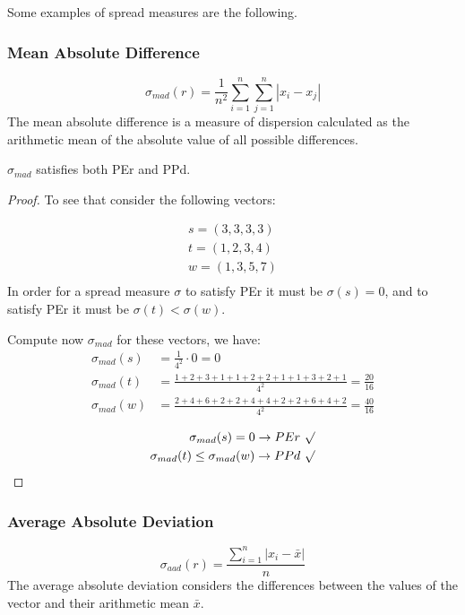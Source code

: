 \documentclass[version=3.21, pagesize, notitlepage, twoside=off, bibliography=totoc, DIV=calc, fontsize=12pt, a4paper]{scrartcl}
\begin{document}
Some examples of spread measures are the following.

\subsubsection{Mean Absolute Difference}
\[\sigma_{mad}(r)= \frac{1}{n^2} \sum_{i=1}^{n}\sum_{j=1}^{n}|x_i-x_j| \]
The mean absolute difference is a measure of dispersion calculated as the arithmetic mean of the absolute value of all possible differences. 
\begin{proposition}
	$\sigma_{mad}$ satisfies both PEr and PPd.
\end{proposition}
\begin{proof}
	To see that consider the following vectors:
	\begin{example}
		\label{ex:spreadVectors}
		\begin{align}
		s=(3,3,3,3) \\
		t=(1,2,3,4) \\
		w=(1,3,5,7) \\
		\end{align}
		In order for a spread measure $\sigma$ to satisfy PEr it must be $\sigma(s)=0$, and to satisfy PEr it must be $\sigma(t)<\sigma(w)$.
	\end{example}
		Compute now $\sigma_{mad}$ for these vectors, we have:
		\begin{align}
		\sigma_{mad}(s) &= \frac{1}{4^2} \cdot 0 =0 \\
		\sigma_{mad}(t) &= \frac{1+2+3+1+1+2+2+1+1+3+2+1}{4^2}=\frac{20}{16} \\
		\sigma_{mad}(w) &= \frac{2+4+6+2+2+4+4+2+2+6+4+2}{4^2}=\frac{40}{16} \\
		\end{align}
		\begin{align}
		\sigma_{mad}(s) = 0 \rightarrow PEr \ \surd \\
		\sigma_{mad}(t) \leq \sigma_{mad}(w) \rightarrow PPd \ \surd \\
		\end{align}
\end{proof}


\subsubsection{Average Absolute Deviation}
\[\sigma_{aad}(r)= \frac{\sum_{i=1}^{n}|x_i-\bar{x}|}{n}\]
The average absolute deviation considers the differences between the values of the vector and their arithmetic mean $\bar{x}$.
\end{document}
